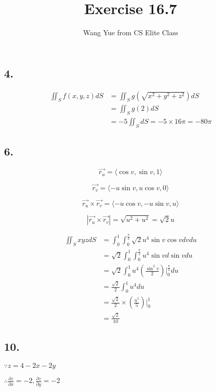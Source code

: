 \documentclass{article}
\begin{document}
  \title{Exercise 16.7}
  \author{Wang Yue from CS Elite Class}
  \maketitle

  \subsection*{4. }

  $$\begin{aligned}
    \iint_S f(x, y, z) dS &= \iint_S g(\sqrt{x^2+y^2+z^2}) dS  \\
    &= \iint_S g(2) dS \\
    &= -5 \iint_S dS = -5 \times 16 \pi = -80\pi 
  \end{aligned}$$

  \subsection*{6. }

  $$\overrightarrow{r_u} = \langle \cos v, \sin v, 1 \rangle$$

  $$\overrightarrow{r_v} = \langle -u\sin v, u\cos v, 0 \rangle$$

  $$\overrightarrow{r_u} \times \overrightarrow{r_v} = \langle -u\cos v, -u\sin v, u \rangle$$

  $$|\overrightarrow{r_u} \times \overrightarrow{r_v}| = \sqrt{u^2 + u^2} = \sqrt 2 u$$

  $$\begin{aligned}
    \iint_S xyz dS &= \int_0^1 \int_0^{\frac \pi 2} \sqrt 2 u^4 \sin v \cos v dv du \\
    &= \sqrt 2 \int_0^1 \int_0^{\frac \pi 2} u^4 \sin v d\sin v du \\
    &= \sqrt 2 \int_0^1 u^4 (\frac{\sin^2 v}{2})\biggl|_0^{\frac \pi 2} du \\
    &= \frac{\sqrt 2}{2} \int_0^1 u^4 du \\
    &= \frac{\sqrt 2}{2} \times (\frac{u^5}{5})\biggl|_0^1 \\
    &= \frac{\sqrt 2}{10}
  \end{aligned}$$

  \subsection*{10. }

  $\because z = 4 - 2x - 2y$

  $\therefore \frac{\partial z}{\partial x} = -2, \frac{\partial z}{\partial y} = -2$
\end{document}

